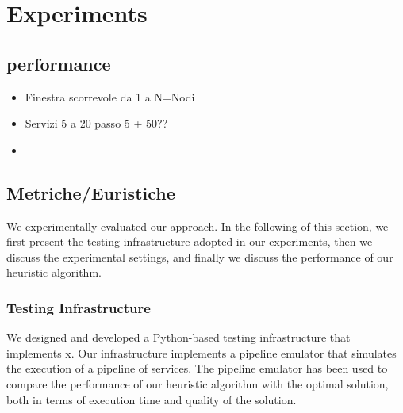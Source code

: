 \section{Experiments}\label{sec:experiment}
\subsection{performance}
\begin{itemize}
  \item Finestra scorrevole da 1 a N=Nodi
  \item Servizi 5 a 20 passo 5 + 50??
  \item
\end{itemize}
\subsection{Metriche/Euristiche}






We experimentally evaluated our approach. In the following of this section, we first present the testing infrastructure adopted in our experiments,
then we discuss the experimental settings, and
finally we discuss the performance of our heuristic algorithm.

\subsubsection{Testing Infrastructure}
We designed and developed a Python-based testing infrastructure that implements x.
Our infrastructure implements a pipeline emulator that simulates the execution of a pipeline of services.
The pipeline emulator has been used to compare the performance of our heuristic algorithm with the optimal solution,
both in terms of execution time and quality of the solution.
